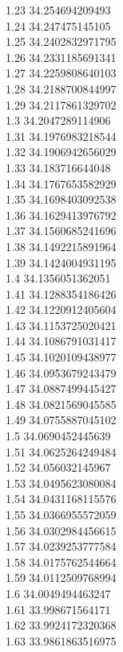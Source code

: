 {1.23	34.254694209493\\
1.24	34.247475145105\\
1.25	34.2402832971795\\
1.26	34.2331185691341\\
1.27	34.2259808640103\\
1.28	34.2188700844997\\
1.29	34.2117861329702\\
1.3	34.2047289114906\\
1.31	34.1976983218544\\
1.32	34.1906942656029\\
1.33	34.183716644048\\
1.34	34.1767653582929\\
1.35	34.1698403092538\\
1.36	34.1629413976792\\
1.37	34.1560685241696\\
1.38	34.1492215891964\\
1.39	34.1424004931195\\
1.4	34.1356051362051\\
1.41	34.1288354186426\\
1.42	34.1220912405604\\
1.43	34.1153725020421\\
1.44	34.1086791031417\\
1.45	34.1020109438977\\
1.46	34.0953679243479\\
1.47	34.0887499445427\\
1.48	34.0821569045585\\
1.49	34.0755887045102\\
1.5	34.0690452445639\\
1.51	34.0625264249484\\
1.52	34.056032145967\\
1.53	34.0495623080084\\
1.54	34.0431168115576\\
1.55	34.0366955572059\\
1.56	34.0302984456615\\
1.57	34.0239253777584\\
1.58	34.0175762544664\\
1.59	34.0112509768994\\
1.6	34.0049494463247\\
1.61	33.998671564171\\
1.62	33.9924172320368\\
1.63	33.9861863516975\\
}
